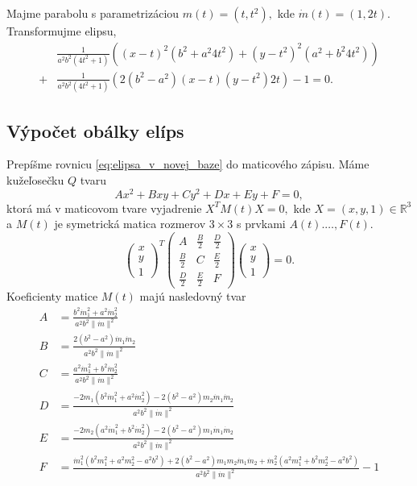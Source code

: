 \begin{example}[Parabola]
Majme parabolu s parametrizáciou $m(t)=(t, t^2), $ kde $\dot{m}(t)=(1, 2t).$ Transformujme elipsu,
\begin{align*}
&\frac{1}{a^{2} b^{2}\left(4 t^{2} + 1\right)} \left( (x-t)^2 (b^2 + a^{2} 4t^2) + (y-t^2)^2 (a^2 + b^2 4t^2) \right)\\
+ &\frac{1}{a^{2} b^{2}\left(4 t^{2} + 1\right)} \left( 2(b^2 - a^2)(x-t)(y-t^2)2t \right) - 1 = 0.
\end{align*}
\end{example}

\subsection{Výpočet obálky elíps}
Prepíšme rovnicu \ref{eq:elipsa_v_novej_baze} do maticového zápisu. Máme kužeľosečku $Q$ tvaru $$
Ax^2 + Bxy + Cy^2 + Dx + Ey + F = 0,$$
ktorá má v maticovom tvare vyjadrenie $X^TM(t)X = 0,$ kde $X=(x, y, 1) \in \mathbb{R}^3$ a $M(t)$ je symetrická matica rozmerov $3 \times 3$ s prvkami $A(t). \dots, F(t) $.
$$
\left(\begin{matrix} x \\ y \\ 1 
\end{matrix} \right)^T \left(\begin{matrix} 
A & \frac{B}{2} & \frac{D}{2} \\
\frac{B}{2} & C & \frac{E}{2} \\
\frac{D}{2} & \frac{E}{2} & F 
\end{matrix} \right)\left(\begin{matrix} x \\ y \\ 1 
\end{matrix} \right) = 0.
$$
Koeficienty matice $M(t)$ majú nasledovný tvar
\begin{align*}
A &= \frac{b^2 \dot{m}_1^2 + a^2 \dot{m}_2^2}{a^2b^2 \| \dot{m} \|^2} \\
B &= \frac{2(b^2-a^2)\dot{m}_1 \dot{m}_2}{a^2b^2 \| \dot{m} \|^2} \\
C &= \frac{a^2 \dot{m}_1^2 + b^2 \dot{m}_2^2}{a^2b^2\| \dot{m} \|^2} \\
D &= \frac{- 2m_1 \left( b^2 \dot{m}_1^2 + a^2 \dot{m}_2^2 \right) - 2 \left(b^2 - a^2 \right) m_2 \dot{m}_1 \dot{m}_2 }{a^2b^2\| \dot{m} \|^2} \\
E &= \frac{- 2m_2 \left( a^2 \dot{m}_1^2 + b^2 \dot{m}_2^2 \right) - 2 \left(b^2 - a^2 \right) m_1 \dot{m}_1 \dot{m}_2 }{a^2b^2\| \dot{m} \|^2} \\
F &= \frac{\dot{m}_1^2 (b^2 m_1^2 + a^2 m_2^2 - a^2b^2) + 2 (b^2 - a^2) m_1 m_2 \dot{m}_1 \dot{m}_2 + \dot{m}_2^2 (a^2 m_1^2 + b^2 m_2^2 - a^2b^2) }{a^2b^2\| \dot{m}  \|^2}  -  1  \\
\end{align*}
